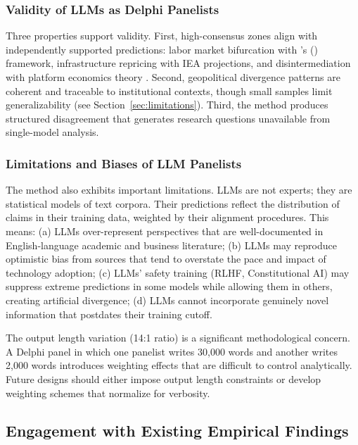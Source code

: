 \documentclass[preprint,review,12pt]{elsarticle}
\begin{document}
\subsubsection{Validity of LLMs as Delphi Panelists}
\label{sec:validity}

Three properties support validity. First, high-consensus zones align with independently supported predictions: labor market bifurcation with \citeauthor{acemoglu2019automation}'s (\citeyear{acemoglu2019automation}) framework, infrastructure repricing with IEA projections, and disintermediation with platform economics theory \citep{goldfarb2019digital}. Second, geopolitical divergence patterns are coherent and traceable to institutional contexts, though small samples limit generalizability (see Section~\ref{sec:limitations}). Third, the method produces structured disagreement that generates research questions unavailable from single-model analysis.


\subsubsection{Limitations and Biases of LLM Panelists}
\label{sec:llm_limitations}

The method also exhibits important limitations. LLMs are not experts; they are statistical models of text corpora. Their predictions reflect the distribution of claims in their training data, weighted by their alignment procedures. This means: (a) LLMs over-represent perspectives that are well-documented in English-language academic and business literature; (b) LLMs may reproduce optimistic bias from sources that tend to overstate the pace and impact of technology adoption; (c) LLMs' safety training (RLHF, Constitutional AI) may suppress extreme predictions in some models while allowing them in others, creating artificial divergence; (d) LLMs cannot incorporate genuinely novel information that postdates their training cutoff.

The output length variation (14:1 ratio) is a significant methodological concern. A Delphi panel in which one panelist writes 30,000 words and another writes 2,000 words introduces weighting effects that are difficult to control analytically. Future designs should either impose output length constraints or develop weighting schemes that normalize for verbosity.


\subsection{Engagement with Existing Empirical Findings}
\label{sec:empirical_engagement}
\end{document}
